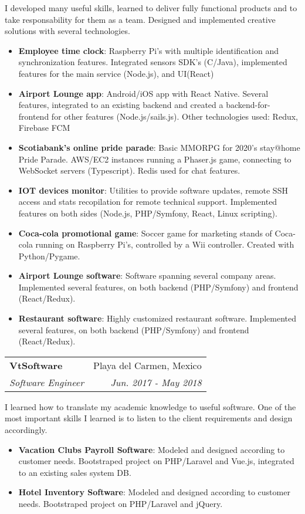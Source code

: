 \documentclass[letterpaper,11pt]{article}
\makeatletter
\newcommand{\resumeItem}[2]{
  \item\small{
    \textbf{#1}{: #2 \vspace{-2pt}}
  }
}
\newcommand{\resumeSubheading}[4]{
  \vspace{-1pt}\item
    \begin{tabular*}{0.97\textwidth}{l@{\extracolsep{\fill}}r}
      \textbf{#1} & #2 \\
      \textit{\small#3} & \textit{\small #4} \\
    \end{tabular*}\vspace{-5pt}
}
\newcommand{\resumeItemListStart}{\begin{itemize}}
\newcommand{\resumeItemListEnd}{\end{itemize}\vspace{-5pt}}
\makeatother
\begin{document}
      I developed many useful skills, learned to deliver fully functional
      products and to take responsability for them as a team. Designed and implemented
      creative solutions with several technologies.
      \resumeItemListStart
        \resumeItem{Employee time clock}
          {Raspberry Pi's with multiple identification and synchronization features. Integrated
            sensors SDK's (C/Java), implemented features for the main service
            (Node.js), and UI(React)}
        \resumeItem{Airport Lounge app}
          {Android/iOS app with React Native. Several features, integrated to an
          existing backend and created a backend-for-frontend for other features
          (Node.js/sails.js). Other technologies used: Redux, Firebase FCM}
        \resumeItem{Scotiabank's online pride parade}
        {Basic MMORPG for 2020's stay@home Pride Parade. AWS/EC2 instances
          running a Phaser.js game, connecting to WebSocket servers (Typescript). Redis 
          used for chat features.}
        \resumeItem{IOT devices monitor}
          {Utilities to provide software updates, remote SSH access and stats
            recopilation for remote technical support. Implemented features on
            both sides (Node.js, PHP/Symfony, React, Linux scripting).}
        \resumeItem{Coca-cola promotional game}
          {Soccer game for marketing stands of Coca-cola running on Raspberry Pi's,
            controlled by a Wii controller. Created with Python/Pygame.}
        \resumeItem{Airport Lounge software}
          {Software spanning several company areas. Implemented several
            features, on both backend (PHP/Symfony) and frontend (React/Redux).}
        \resumeItem{Restaurant software}
          {Highly customized restaurant software. Implemented several features,
            on both backend (PHP/Symfony) and frontend (React/Redux).}
      \resumeItemListEnd

    \resumeSubheading
      {VtSoftware}{Playa del Carmen, Mexico}
      {Software Engineer}{Jun. 2017 - May 2018}
      \vspace{3pt}

      I learned how to translate my academic knowledge to useful software. One
      of the most important skills I learned is to listen to the client
      requirements and design accordingly.

      \resumeItemListStart
        \resumeItem{Vacation Clubs Payroll Software}
          {Modeled and designed according to customer needs. Bootstraped
            project on PHP/Laravel and Vue.js, integrated to an existing sales
            system DB.}
        \resumeItem{Hotel Inventory Software}
          {Modeled and designed according to customer needs. Bootstraped project
          on PHP/Laravel and jQuery.}
      \resumeItemListEnd
\end{document}
